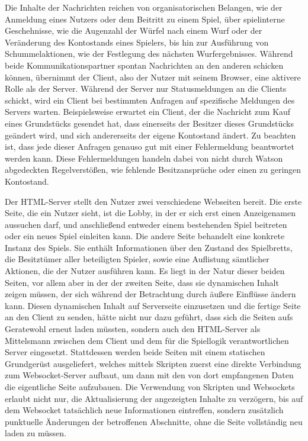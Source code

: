 \documentclass[german]{cgspaper} %
\begin{document}
Die Inhalte der Nachrichten reichen von organisatorischen Belangen, wie der Anmeldung eines Nutzers oder dem Beitritt zu einem Spiel, über spielinterne Geschehnisse, wie die Augenzahl der Würfel nach einem Wurf oder der Veränderung des Kontostands eines Spielers, bis hin zur Ausführung von Schummelaktionen, wie der Festlegung des nächsten Wurfergebnisses.
Während beide Kommunikationspartner spontan Nachrichten an den anderen schicken können, übernimmt der Client, also der Nutzer mit seinem Browser, eine aktivere Rolle als der Server.
Während der Server nur Statusmeldungen an die Clients schickt, wird ein Client bei bestimmten Anfragen auf spezifische Meldungen des Servers warten. Beispielsweise erwartet ein Client, der die Nachricht zum Kauf eines Grundstücks gesendet hat, dass einerseits der Besitzer dieses Grundstücks geändert wird, und sich andererseits der eigene Kontostand ändert.
Zu beachten ist, dass jede dieser Anfragen genauso gut mit einer Fehlermeldung beantwortet werden kann. Diese Fehlermeldungen handeln dabei von nicht durch Watson abgedeckten Regelverstößen, wie fehlende Besitzansprüche oder einen zu geringen Kontostand.

Der HTML-Server stellt den Nutzer zwei verschiedene Webseiten bereit.
Die erste Seite, die ein Nutzer sieht, ist die Lobby, in der er sich erst einen Anzeigenamen aussuchen darf, und anschließend entweder einem bestehenden Spiel beitreten oder ein neues Spiel einleiten kann.
Die andere Seite behandelt eine konkrete Instanz des Spiels. Sie enthält Informationen über den Zustand des Spielbretts, die Besitztümer aller beteiligten Spieler, sowie eine Auflistung sämtlicher Aktionen, die der Nutzer ausführen kann.
Es liegt in der Natur dieser beiden Seiten, vor allem aber in der der zweiten Seite, dass sie dynamischen Inhalt zeigen müssen, der sich während der Betrachtung durch äußere Einflüsse ändern kann.
Diesen dynamischen Inhalt auf Serverseite einzusetzen und die fertige Seite an den Client zu senden, hätte nicht nur dazu geführt, dass sich die Seiten aufs Geratewohl erneut laden müssten, sondern auch den HTML-Server als Mittelsmann zwischen dem Client und dem für die Spiellogik verantwortlichen Server eingesetzt.
Stattdessen werden beide Seiten mit einem statischen Grundgerüst ausgeliefert, welches mittels Skripten zuerst eine direkte Verbindung zum Websocket-Server aufbaut, um dann mit den von dort empfangenen Daten die eigentliche Seite aufzubauen.
Die Verwendung von Skripten und Websockets erlaubt nicht nur, die Aktualisierung der angezeigten Inhalte zu verzögern, bis auf dem Websocket tatsächlich neue Informationen eintreffen, sondern zusätzlich punktuelle Änderungen der betroffenen Abschnitte, ohne die Seite vollständig neu laden zu müssen.
\end{document}
